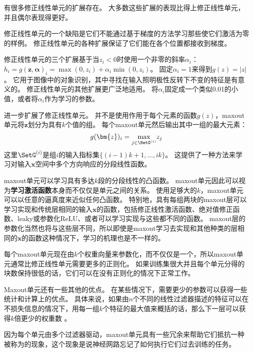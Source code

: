 有很多修正线性单元的扩展存在。
大多数这些扩展的表现比得上修正线性单元，并且偶尔表现得更好。

修正线性单元的一个缺陷是它们不能通过基于梯度的方法学习那些使它们激活为零的样例。
修正线性单元的各种扩展保证了它们能在各个位置都接收到梯度。

修正线性单元的三个扩展基于当$z_i<0$时使用一个非零的斜率$\alpha_i$：$h_i =g(\bm{z}, \bm{\alpha})_i = \max(0, z_i) + \alpha_i \min(0, z_i)$。
固定$\alpha_i=1$来得到$g(z)=|z|$。
它用于图像中的对象识别\citep{Jarrett-ICCV2009}，其中寻找在输入照明极性反转下不变的特征是有意义的。
修正线性单元的其他扩展更广泛地适用。
\citep{Maas-et-al-ICML2013}将$\alpha_i$固定成一个类似0.01的小值，或者\textbf{}将$\alpha_i$作为学习的参数\citep{He-et-al-arxiv2015}。


\citep{Goodfellow_maxout_2013}进一步扩展了修正线性单元。
并不是使用作用于每个元素的函数$g(z)$，maxout单元将$\bm{z}$划分为具有$k$个值的组。
每个maxout单元然后输出其中一组的最大元素：
\begin{equation}
g(\bm{z})_i = \underset{j\in \SetG^{(i)}}{\max} z_j
\end{equation}
这里$\SetG^{(i)}$是组$i$的输入指标集$\{(i-1)k+1, \ldots, ik\}$。
这提供了一种方法来学习对输入$\bm{x}$空间中多个方向响应的分段线性函数。

maxout单元可以学习具有多达$k$段的分段线性的凸函数。
maxout单元因此可以视为\textbf{学习激活函数}本身而不仅仅是单元之间的关系。
使用足够大的$k$，maxout单元可以以任意的逼真度来近似任何凸函数。
特别地，具有每组两块的maxout层可以学习实现和传统层相同的输入$\bm{x}$的函数，包括修正线性激活函数、绝对值修正函数、leaky或参数化ReLU、或者可以学习实现与这些都不同的函数。
maxout层的参数化当然也将与这些层不同，所以即使是maxout学习去实现和其他种类的层相同的$\bm{x}$的函数这种情况下，学习的机理也是不一样的。

每个maxout单元现在由$k$个权重向量来参数化，而不仅仅是一个，所以maxout单元通常比修正线性单元需要更多的正则化。
如果训练集很大并且每个单元分得的块数保持很低的话，它们可以在没有正则化的情况下正常工作\citep{cai2013deep}。

Maxout单元还有一些其他的优点。
在某些情况下，需要更少的参数可以获得一些统计和计算上的优点。
具体来说，如果由$n$个不同的线性过滤器描述的特征可以在不损失信息的情况下，用每一组$k$个特征的最大值来概括的话，那么下一层可以获得$k$倍更少的权重数 。

因为每个单元由多个过滤器驱动，maxout单元具有一些冗余来帮助它们抵抗一种被称为的现象，这个现象是说神经网路忘记了如何执行它们过去训练的任务\citep{Goodfellow+al-ICLR2014-small}。

